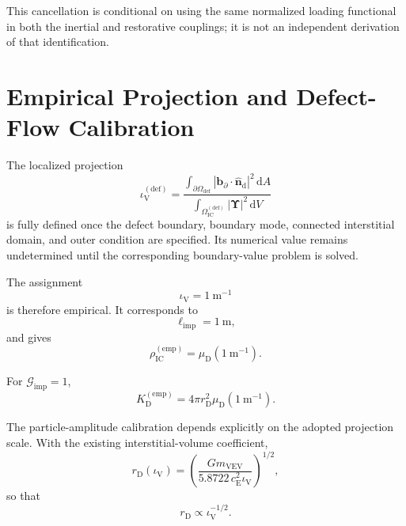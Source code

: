 This cancellation is conditional on using the same normalized loading functional in both the inertial and restorative couplings; it is not an independent derivation of that identification.


\section[Empirical Projection and Calibration]{Empirical Projection and Defect-Flow Calibration}
\label{sec:AP_empirical_projection}

The localized projection
\begin{equation}
    \iota_{\mathrm{V}}^{(\mathrm{def})}
    =
    \frac{
        \displaystyle
        \int_{\partial\Omega_{\mathrm{def}}}
        |\mathbf{b}_{\partial}\cdot\hat{\mathbf{n}}_{\mathrm{d}}|^2
        \,
        \mathrm{d}A
    }{
        \displaystyle
        \int_{\Omega_{\mathrm{IC}}^{(\mathrm{def})}}
        |\boldsymbol{\Upsilon}|^2
        \,
        \mathrm{d}V
    }
\end{equation}
is fully defined once the defect boundary, boundary mode, connected interstitial domain, and outer condition are specified. Its numerical value remains undetermined until the corresponding boundary-value problem is solved.

The assignment
\begin{equation}
    \iota_{\mathrm{V}}
    =
    1\ \mathrm{m}^{-1}
\end{equation}
is therefore empirical. It corresponds to
\begin{equation}
    \ell_{\mathrm{imp}}
    =
    1\ \mathrm{m},
\end{equation}
and gives
\begin{equation}
    \rho_{\mathrm{IC}}^{(\mathrm{emp})}
    =
    \mu_{\mathrm{D}}
    \left(
        1\ \mathrm{m}^{-1}
    \right).
\end{equation}

For $\mathcal{G}_{\mathrm{imp}}=1$,
\begin{equation}
    K_{\mathrm{D}}^{(\mathrm{emp})}
    =
    4\pi r_{\mathrm{D}}^2
    \mu_{\mathrm{D}}
    \left(
        1\ \mathrm{m}^{-1}
    \right).
\end{equation}

The particle-amplitude calibration depends explicitly on the adopted projection scale. With the existing interstitial-volume coefficient,
\begin{equation}
    r_{\mathrm{D}}(\iota_{\mathrm{V}})
    =
    \left(
        \frac{
            Gm_{\mathrm{VEV}}
        }{
            5.8722\,c_{\mathrm{E}}^2
            \iota_{\mathrm{V}}
        }
    \right)^{1/2},
\end{equation}
so that
\begin{equation}
    r_{\mathrm{D}}
    \propto
    \iota_{\mathrm{V}}^{-1/2}.
\end{equation}

